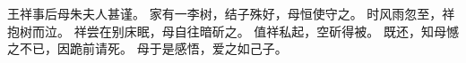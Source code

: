 
\switchcolumn*[\section{}]

王祥事后母朱夫人甚谨。
家有一李树，结子殊好，母恒使守之。
时风雨忽至，祥抱树而泣。
祥尝在别床眠，母自往暗斫之。
值祥私起，空斫得被。
既还，知母憾之不已，因跪前请死。
母于是感悟，爱之如己子。

\switchcolumn



